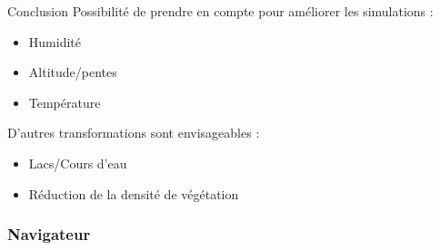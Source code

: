 \documentclass{beamer}
\begin{document}
\begin{frame}{Conclusion \hyperlink{jump}{\beamerbutton{ }} \hypertarget{16}{\beamerbutton{ }}}
    Possibilité de prendre en compte pour améliorer les simulations :
    \begin{itemize}
        \item Humidité
        \item Altitude/pentes
        \item Température
    \end{itemize}

    D'autres transformations sont envisageables :
    \begin{itemize}
        \item Lacs/Cours d'eau
        \item Réduction de la densité de végétation
    \end{itemize}
\end{frame}

\begin{frame}
    \frametitle{Navigateur \hypertarget{jump}{\beamerbutton{ }}}
    
    \hyperlink{1}{} \\
    \hyperlink{2}{} \\
    \hyperlink{3}{} \\
    \hyperlink{4}{} \\
    \hyperlink{5}{} \\
    \hyperlink{6}{} \\
    \hyperlink{7}{} \\
    \hyperlink{8}{} \\
    \hyperlink{9}{} \\
    \hyperlink{10}{} \\
    \hyperlink{11}{} \\
    \hyperlink{12}{} \\
    \hyperlink{13}{} \\
    \hyperlink{14}{} \\
    \hyperlink{15}{} \\
    \hyperlink{16}{}
\end{frame}
\end{document}
